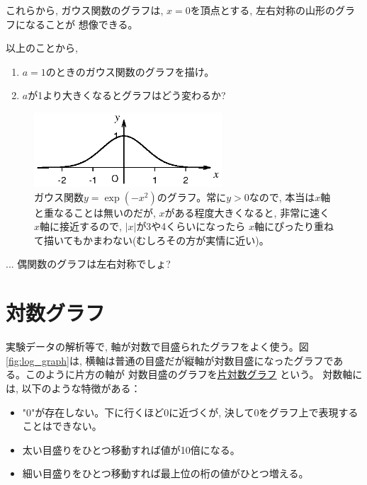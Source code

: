 これらから, ガウス関数のグラフは, $x=0$を頂点とする, 左右対称の山形のグラフになることが
想像できる。\mv

\begin{q}\label{q:exp_Gauss_graph} 以上のことから, 
\begin{enumerate}
\item $a=1$のときのガウス関数のグラフを描け。
\item $a$が1より大きくなるとグラフはどう変わるか? 
\end{enumerate}\end{q}

\begin{figure}[h]
    \centering
    \includegraphics[width=7cm]{Gauss_fnc.eps}
    \caption{ガウス関数$y=\exp(-x^2)$のグラフ。常に$y>0$なので, 
本当は$x$軸と重なることは無いのだが, $x$がある程度大きくなると, 
非常に速く$x$軸に接近するので, $|x|$が3や4くらいになったら
$x$軸にぴったり重ねて描いてもかまわない(むしろその方が実情に近い)。
\label{fig:Gauss_func}}
\end{figure}

\begin{freqmiss}{\small{} ... 偶関数のグラフは左右対称でしょ?}\end{freqmiss}
\mv


\section{対数グラフ}

実験データの解析等で, 軸が対数で目盛られたグラフをよく使う。図\ref{fig:log_graph}は, 
横軸は普通の目盛だが縦軸が対数目盛になったグラフである。このように片方の軸が
対数目盛のグラフを\underline{片対数グラフ} という。
対数軸には, 以下のような特徴がある：
\begin{itemize}
\item "0"が存在しない。下に行くほど0に近づくが, 決して0をグラフ上で表現することはできない。
\item 太い目盛りをひとつ移動すれば値が10倍になる。
\item 細い目盛りをひとつ移動すれば最上位の桁の値がひとつ増える。
\end{itemize}


